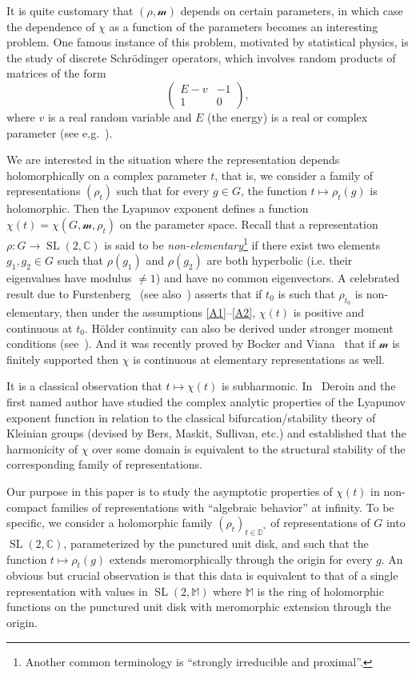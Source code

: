 \documentclass[AHL,Unicode,longabstracts]{cedram}
\DeclareMathOperator{\SL}{SL}
\newcommand{\dD}{\mathbb{D}}
\newcommand{\sm}{\mathcal{m}}
\newcommand{\mm}{\mathbb{M}}
\newcommand{\SLC}{\SL(2,\mathbb C)}
\begin{document}
It is quite customary that $(\rho, \sm)$ depends on certain parameters, in which case the dependence of $\chi$ as a function of the parameters becomes an interesting problem. One famous instance of this problem, motivated by statistical physics, is the study of discrete Schr\"odinger operators, which involves random products of matrices of the form
\[
\begin{pmatrix} E-v & -1 \\ 1 & 0
\end{pmatrix},
\]
where $v$ is a real random variable and $E$ (the energy) is a real or complex parameter
(see e.g.~\cite{bougerol-lacroix}).


We are interested in the situation where the representation depends holomorphically on a complex parameter $t$, that is, we consider a family of representations $(\rho_t)$ such that for every $g\in G$, the function $t\mapsto \rho_t(g)$ is holomorphic. Then the Lyapunov exponent defines a function $\chi(t) = \chi(G, \sm, \rho_t)$ on the parameter space. Recall that a representation $\rho: G \to \SLC$ is said to be \emph{non-elementary}\footnote{Another common terminology is ``strongly irreducible and proximal''.} if there exist two elements $g_1, g_2 \in G$ such that $\rho(g_1)$ and $\rho(g_2)$ are both hyperbolic (i.e. their eigenvalues have modulus $\neq 1$) and have no common eigenvectors. A celebrated result due to Furstenberg~\cite{furstenberg} (see also~\cite{furstenberg-kifer}) asserts that if $t_0$ is such that $\rho_{t_0}$ is non-elementary, then under the assumptions \eqref{A1}--\eqref{A2}, $\chi(t)$ is positive and continuous at $t_0$. H\"older continuity can also be derived under stronger moment conditions (see~\cite{lepage-holder}). And it was recently proved by Bocker and Viana~\cite{bocker-viana} that if $\sm$ is finitely supported then $\chi$ is continuous at elementary representations as well.

It is a classical observation that $t\mapsto \chi(t)$ is subharmonic. In~\cite{kleinbif, bers1} Deroin and the first named author have studied the complex analytic properties of the Lyapunov exponent function in relation to the classical bifurcation/stability theory of Kleinian groups (devised by Bers, Maskit, Sullivan, etc.) and established that the harmonicity of $\chi$ over some domain is equivalent to the structural stability of the corresponding family of representations.


Our purpose in this paper is to study the asymptotic properties of $\chi(t)$ in non-compact families of representations with ``algebraic behavior'' at infinity. To be specific, we consider a holomorphic family $(\rho_t)_{t\in \dD^*}$ of representations of $G$ into $\SLC$, parameterized by the punctured unit disk, and such that the function $t\mapsto \rho_t(g)$ extends meromorphically through the origin for every $g$. An obvious but crucial observation is that this data is equivalent to that of a single representation with values in $\SL(2, \mm)$ where $\mm$ is the ring of holomorphic functions on the punctured unit disk with meromorphic extension through the origin.
\end{document}
